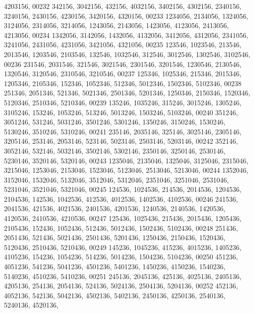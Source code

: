 \begin{DoxyCode}
      4203156,
00232        342156, 3042156,  432156, 4032156, 3402156, 4302156, 2340156, 3240156, 2430156, 4230156, 3420156, 
      4320156,
00233       1234056, 2134056, 1324056, 3124056, 2314056, 3214056, 1243056, 2143056, 1423056, 4123056, 2413056, 
      4213056,
00234       1342056, 3142056, 1432056, 4132056, 3412056, 4312056, 2341056, 3241056, 2431056, 4231056, 3421056, 
      4321056,
00235        123546, 1023546,  213546, 2013546, 1203546, 2103546,  132546, 1032546,  312546, 3012546, 1302546, 
      3102546,
00236        231546, 2031546,  321546, 3021546, 2301546, 3201546, 1230546, 2130546, 1320546, 3120546, 2310546, 
      3210546,
00237        125346, 1025346,  215346, 2015346, 1205346, 2105346,  152346, 1052346,  512346, 5012346, 1502346, 
      5102346,
00238        251346, 2051346,  521346, 5021346, 2501346, 5201346, 1250346, 2150346, 1520346, 5120346, 2510346, 
      5210346,
00239        135246, 1035246,  315246, 3015246, 1305246, 3105246,  153246, 1053246,  513246, 5013246, 1503246, 
      5103246,
00240        351246, 3051246,  531246, 5031246, 3501246, 5301246, 1350246, 3150246, 1530246, 5130246, 3510246, 
      5310246,
00241        235146, 2035146,  325146, 3025146, 2305146, 3205146,  253146, 2053146,  523146, 5023146, 2503146, 
      5203146,
00242        352146, 3052146,  532146, 5032146, 3502146, 5302146, 2350146, 3250146, 2530146, 5230146, 3520146, 
      5320146,
00243       1235046, 2135046, 1325046, 3125046, 2315046, 3215046, 1253046, 2153046, 1523046, 5123046, 2513046, 
      5213046,
00244       1352046, 3152046, 1532046, 5132046, 3512046, 5312046, 2351046, 3251046, 2531046, 5231046, 3521046, 
      5321046,
00245        124536, 1024536,  214536, 2014536, 1204536, 2104536,  142536, 1042536,  412536, 4012536, 1402536, 
      4102536,
00246        241536, 2041536,  421536, 4021536, 2401536, 4201536, 1240536, 2140536, 1420536, 4120536, 2410536, 
      4210536,
00247        125436, 1025436,  215436, 2015436, 1205436, 2105436,  152436, 1052436,  512436, 5012436, 1502436, 
      5102436,
00248        251436, 2051436,  521436, 5021436, 2501436, 5201436, 1250436, 2150436, 1520436, 5120436, 2510436, 
      5210436,
00249        145236, 1045236,  415236, 4015236, 1405236, 4105236,  154236, 1054236,  514236, 5014236, 1504236, 
      5104236,
00250        451236, 4051236,  541236, 5041236, 4501236, 5401236, 1450236, 4150236, 1540236, 5140236, 4510236, 
      5410236,
00251        245136, 2045136,  425136, 4025136, 2405136, 4205136,  254136, 2054136,  524136, 5024136, 2504136, 
      5204136,
00252        452136, 4052136,  542136, 5042136, 4502136, 5402136, 2450136, 4250136, 2540136, 5240136, 4520136, 

\end{DoxyCode}

